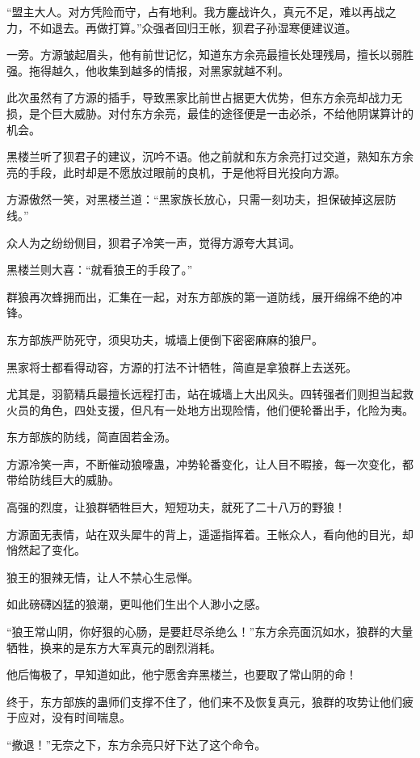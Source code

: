\begin{this_body}
“盟主大人。对方凭险而守，占有地利。我方鏖战许久，真元不足，难以再战之力，不如退去。再做打算。”众强者回归王帐，狈君子孙湿寒便建议道。

一旁。方源皱起眉头，他有前世记忆，知道东方余亮最擅长处理残局，擅长以弱胜强。拖得越久，他收集到越多的情报，对黑家就越不利。

此次虽然有了方源的插手，导致黑家比前世占据更大优势，但东方余亮却战力无损，是个巨大威胁。对付东方余亮，最佳的途径便是一击必杀，不给他阴谋算计的机会。

黑楼兰听了狈君子的建议，沉吟不语。他之前就和东方余亮打过交道，熟知东方余亮的手段，此时却是不愿放过眼前的良机，于是他将目光投向方源。

方源傲然一笑，对黑楼兰道：“黑家族长放心，只需一刻功夫，担保破掉这层防线。”

众人为之纷纷侧目，狈君子冷笑一声，觉得方源夸大其词。

黑楼兰则大喜：“就看狼王的手段了。”

群狼再次蜂拥而出，汇集在一起，对东方部族的第一道防线，展开绵绵不绝的冲锋。

东方部族严防死守，须臾功夫，城墙上便倒下密密麻麻的狼尸。

黑家将士都看得动容，方源的打法不计牺牲，简直是拿狼群上去送死。

尤其是，羽箭精兵最擅长远程打击，站在城墙上大出风头。四转强者们则担当起救火员的角色，四处支援，但凡有一处地方出现险情，他们便轮番出手，化险为夷。

东方部族的防线，简直固若金汤。

方源冷笑一声，不断催动狼嚎蛊，冲势轮番变化，让人目不暇接，每一次变化，都带给防线巨大的威胁。

高强的烈度，让狼群牺牲巨大，短短功夫，就死了二十八万的野狼！

方源面无表情，站在双头犀牛的背上，遥遥指挥着。王帐众人，看向他的目光，却悄然起了变化。

狼王的狠辣无情，让人不禁心生忌惮。

如此磅礴凶猛的狼潮，更叫他们生出个人渺小之感。

“狼王常山阴，你好狠的心肠，是要赶尽杀绝么！”东方余亮面沉如水，狼群的大量牺牲，换来的是东方大军真元的剧烈消耗。

他后悔极了，早知道如此，他宁愿舍弃黑楼兰，也要取了常山阴的命！

终于，东方部族的蛊师们支撑不住了，他们来不及恢复真元，狼群的攻势让他们疲于应对，没有时间喘息。

“撤退！”无奈之下，东方余亮只好下达了这个命令。


\end{this_body}
